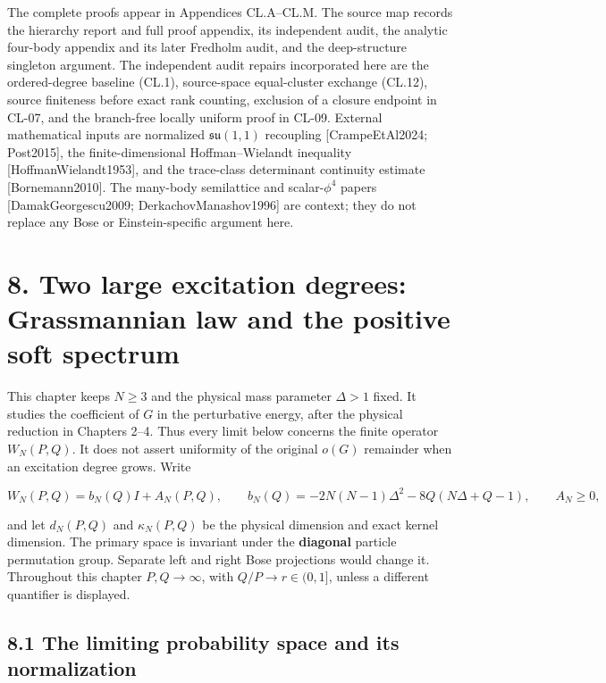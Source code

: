 The complete proofs appear in Appendices CL.A--CL.M. The source map records the hierarchy report and full proof appendix, its independent audit, the analytic four-body appendix and its later Fredholm audit, and the deep-structure singleton argument. The independent audit repairs incorporated here are the ordered-degree baseline (CL.1), source-space equal-cluster exchange (CL.12), source finiteness before exact rank counting, exclusion of a closure endpoint in CL-07, and the branch-free locally uniform proof in CL-09. External mathematical inputs are normalized \(\mathfrak{su}(1,1)\) recoupling {[}CrampeEtAl2024; Post2015{]}, the finite-dimensional Hoffman--Wielandt inequality {[}HoffmanWielandt1953{]}, and the trace-class determinant continuity estimate {[}Bornemann2010{]}. The many-body semilattice and scalar-\(\phi^4\) papers {[}DamakGeorgescu2009; DerkachovManashov1996{]} are context; they do not replace any Bose or Einstein-specific argument here.

\clearpage
\hypertarget{two-large-excitation-degrees-grassmannian-law-and-the-positive-soft-spectrum}{%
\section{8. Two large excitation degrees: Grassmannian law and the positive soft spectrum}\label{two-large-excitation-degrees-grassmannian-law-and-the-positive-soft-spectrum}}

This chapter keeps \(N\geq3\) and the physical mass parameter \(\Delta>1\) fixed. It studies the coefficient of \(G\) in the perturbative energy, after the physical reduction in Chapters 2--4. Thus every limit below concerns the finite operator \(W_N(P,Q)\). It does not assert uniformity of the original \(o(G)\) remainder when an excitation degree grows. Write

\[
W_N(P,Q)=b_N(Q)I+A_N(P,Q),\qquad
b_N(Q)=-2N(N-1)\Delta^2-8Q(N\Delta+Q-1),\qquad A_N\geq0,
\]

and let \(d_N(P,Q)\) and \(\kappa_N(P,Q)\) be the physical dimension and exact kernel dimension. The primary space is invariant under the \textbf{diagonal} particle permutation group. Separate left and right Bose projections would change it. Throughout this chapter \(P,Q\to\infty\), with \(Q/P\to r\in(0,1]\), unless a different quantifier is displayed.

\hypertarget{the-limiting-probability-space-and-its-normalization}{%
\subsection{8.1 The limiting probability space and its normalization}\label{the-limiting-probability-space-and-its-normalization}}

